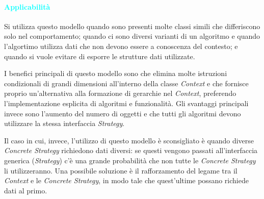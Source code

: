 \paragraph{\textcolor{cyan}{Applicabilità}} Si utilizza questo modello quando sono presenti
molte classi simili che differiscono solo nel comportamento; quando ci sono diversi
varianti di un algoritmo e quando l'algortimo utilizza dati che non devono essere a conoscenza
del contesto; e quando si vuole evitare di esporre le strutture dati utilizzate.

I benefici principali di questo modello sono che elimina molte istruzioni condizionali
di grandi dimensioni all'interno della classe \emph{Context} e che fornisce proprio un'alternativa
alla formazione di gerarchie nel \emph{Context}, preferendo l'implementazione esplicita di algoritmi
e funzionalità. Gli svantaggi principali invece sono l'aumento del numero di oggetti e che tutti gli 
algoritmi devono utilizzare la stessa interfaccia \emph{Strategy}.

Il caso in cui, invece, l'utilizzo di questo modello è sconsigliato è quando
diverse \emph{Concrete Strategy} richiedono dati diversi: se questi vengono passati all'interfaccia generica
(\emph{Strategy}) c'è una grande probabilità che non tutte le \emph{Concrete Strategy} li utilizzeranno. Una possibile
soluzione è il rafforzamento del legame tra il \emph{Context} e le \emph{Concrete Strategy}, in modo tale che quest'ultime
possano richiede dati al primo.
